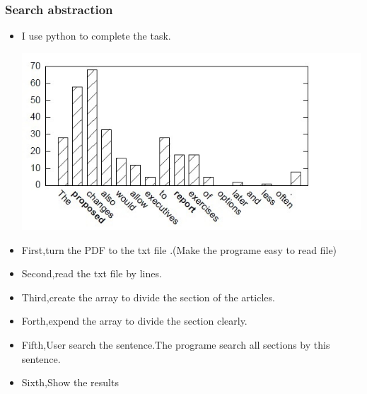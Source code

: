 \subsubsection*{Search abstraction}
\begin{itemize}
	\item I use python to complete the task. 
	\begin{center}
		\includegraphics[width=0.8\columnwidth]{Union_Background_Chart_2}
	\end{center}
	\item First,turn the PDF to the txt file .(Make the programe easy to read file)\\ 
	\item Second,read the txt file by lines.\\ 	
	\item Third,create the array to divide the section of the articles.\\ 	
	\item Forth,expend the array to divide the section clearly.\\ 	
	\item Fifth,User search the sentence.The programe search all sections by this sentence.\\
	\item Sixth,Show the results\\  		
	
\end{itemize}

\newpage %